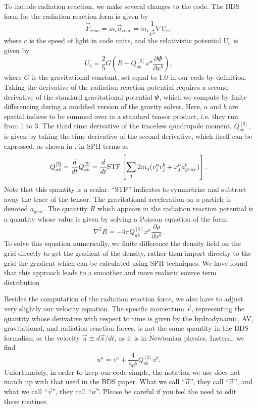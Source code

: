 To include radiation reaction, we make several changes to the code.
The BDS form for the radiation reaction form is given by 
\begin{equation}
\vec{F}_{reac}=m_i\vec{a}_{reac}=m_i \frac{1}{c^5}\nabla  U_5,
\label{eq:rr1}
\end{equation}
where $c$ is the speed of light in code units, and the relativistic
potential $U_5$ is given by
\begin{equation}
U_5=\frac{2}{5}G\left(R-Q^{[3]}_{ab}x^a \frac{\partial\Phi}{\partial
x^b}\right), \label{eq:rr2}
\end{equation}
where $G$ is the gravitational constant, set equal to $1.0$ in our
code by definition.  Taking the derivative of the radiation reaction
potential requires a second derivative of the standard gravitational
potential $\Phi$, which we compute by finite differencing during a
modified version of the gravity solver.  Here, $a$ and $b$ are spatial
indices to be summed 
over in a standard tensor product, i.e. they run from 1 to 3.  The
third time derivative of the traceless quadrupole moment, $Q^{[3]}_{ab}$, is
given by taking the time derivative of the second derivative, which
itself can be expressed, as shown in \citet{RS1}, in SPH terms as 
\begin{equation}
Q^{[3]}_{ab}=\frac{d}{dt}Q^{[2]}_{ab}=\frac{d}{dt} {\rm STF}\left [\sum_j
2m_j(v_j^a v_j^b +x_j^a a_{grav}^b)\right]\label{eq:rr3}.
\end{equation}
Note that this quantity is a scalar.
``STF'' indicates to symmetrize and subtract away the trace of the
tensor.  The gravitational acceleration on a particle is denoted
$a_{grav}$.  The quantity $R$ which appears in the radiation
reaction potential is a quantity whose value is given by solving a
Poisson equation of the form
\begin{equation}
\nabla^2 R=-4\pi Q^{[3]}_{ab}x^a\frac{\partial \rho}{\partial x^b}.
\label{eq:rr4}
\end{equation}
To solve this equation numerically, we finite difference the density
field on the grid directly to get the gradient of the density, rather
than import directly to the grid the gradient which can be calculated
using SPH techniques.  We have found that this approach leads to a
smoother and more realistic source term distribution

Besides the computation of the radiation reaction force, we also have
to adjust very slightly our velocity equation.
The specific momentum $\vec{v}$, representing the quantity whose
derivative with respect to time is given by the hydrodynamic, AV,
gravitational, and radiation reaction forces, is not the same quantity
in the BDS formalism as the velocity $\vec{u}\equiv d\vec{x}/dt$, as it
is in Newtonian physics. Instead, we find
\begin{equation}
u^a=v^a+\frac{4}{5c^5} Q^{[3]}_{ab}v^b. \label{eq:rr5}
\end{equation}
Unfortunately, in order to keep our code simple, the notation we use
does not match up with that used in the BDS paper.  What we call
``$\vec{u}$'', they call ``$\vec{v}$'', and what we call ``$\vec{v}$'',
they call ``$\vec{w}$''.  Please be careful if you feel the need to
edit these routines. 

